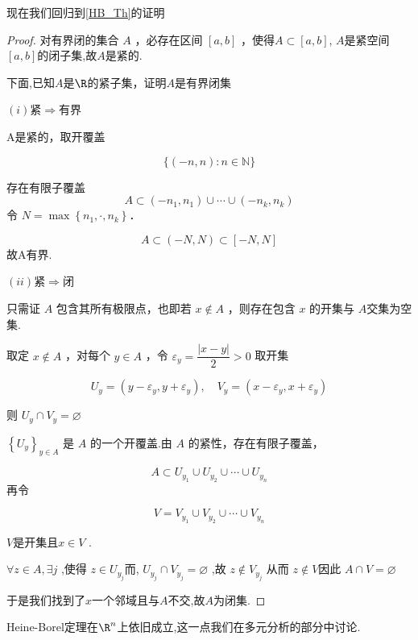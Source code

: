现在我们回归到\ref{HB_Th}的证明
\begin{proof}
	对有界闭的集合 $A$ ，必存在区间 $[a, b]$ ，使得$A \subset[a, b]$, $A$是紧空间$\left[a,b\right]$的闭子集,故$A$是紧的.
	
	下面,已知$A$是$\R$的紧子集，证明$A$是有界闭集
	
	$(i)$紧$\Rightarrow$有界
	
	A是紧的，取开覆盖
	
	$$
	\{(-n, n): n \in \mathbb{N}\}
	$$
	
	
	存在有限子覆盖
	$$A \subset\left(-n_1, n_1\right) \cup \cdots \cup\left(-n_k, n_k\right)$$
	令 $N=\max \left\{n_1, \cdot, n_k\right\}$．
	
	$$A \subset(-N, N) \subset \left[-N,N\right]$$
	故A有界.
	
	$(ii)$紧$\Rightarrow$闭
	
	只需证 $A$ 包含其所有极限点，也即若 $x \notin A$ ，则存在包含 $x$ 的开集与 $A$交集为空集.
	
	取定 $x \notin A$ ，对每个 $y \in A$ ，令 $\varepsilon_y=\dfrac{|x-y|}{2}>0$
	取开集
	
	$$
	U_y=\left(y-\varepsilon_y, y+\varepsilon_y\right), \quad V_y=\left(x-\varepsilon_y, x+\varepsilon_y\right)
	$$
	
	
	则 $U_y \cap V_y=\varnothing$
	
	$\left\{U_y\right\}_{y \in A}$ 是 $A$ 的一个开覆盖.由 $A$ 的紧性，存在有限子覆盖，
	
	
	$$
	A \subset U_{y_1} \cup U_{y_2} \cup \cdots \cup U_{y_n}
	$$
	再令
	
	$$
	V=V_{y_1}\cup V_{y_2}\cup \cdots \cup V_{y_n}
	$$
	
	
	$V$是开集且$x \in V$ .
	
	
	$\forall z \in A, \exists j$ ,使得 $z \in U_{y_j}$而, $U_{y_j} \cap V_{y_j}=\varnothing$ ,故 $z \notin V_{y _j}$ 从而 $z \notin V$因此 $A \cap V=\varnothing$
	
	于是我们找到了$x$一个邻域且与$A$不交,故$A$为闭集.
\end{proof}

Heine-Borel定理在$\R^n$上依旧成立,这一点我们在多元分析的部分中讨论.

